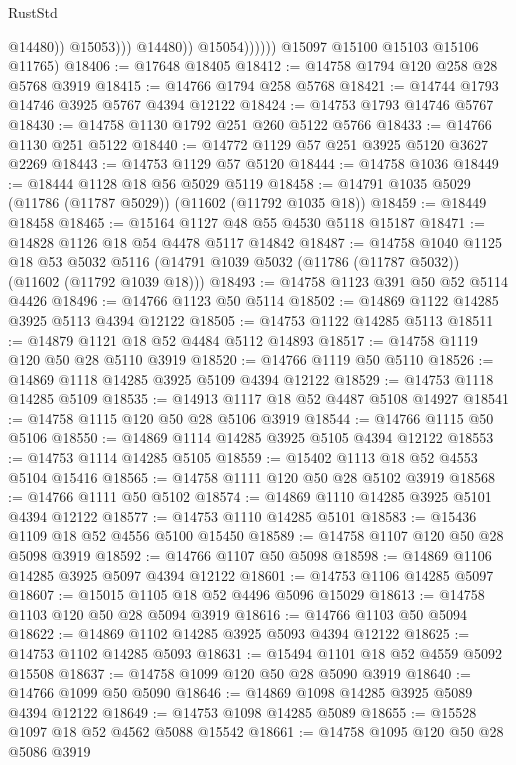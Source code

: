 \begin{lexlean}{RustStd}
\begin{coremodule}
                                @14480))
                            @15053)))
                      @14480))
                  @15054))))))
      @15097
      @15100
      @15103
      @15106
      @11765)
@18406 := @17648 @18405
@18412 := @14758 @1794 @120 @258 @28 @5768 @3919
@18415 := @14766 @1794 @258 @5768
@18421 := @14744 @1793 @14746 @3925 @5767 @4394 @12122
@18424 := @14753 @1793 @14746 @5767
@18430 := @14758 @1130 @1792 @251 @260 @5122 @5766
@18433 := @14766 @1130 @251 @5122
@18440 := @14772 @1129 @57 @251 @3925 @5120 @3627 @2269
@18443 := @14753 @1129 @57 @5120
@18444 := @14758 @1036
@18449 := @18444 @1128 @18 @56 @5029 @5119
@18458 := @14791 @1035 @5029 (@11786 (@11787 @5029)) (@11602 (@11792 @1035 @18))
@18459 := @18449 @18458
@18465 := @15164 @1127 @48 @55 @4530 @5118 @15187
@18471 := @14828 @1126 @18 @54 @4478 @5117 @14842
@18487 := @14758
    @1040
    @1125
    @18
    @53
    @5032
    @5116
    (@14791 @1039 @5032 (@11786 (@11787 @5032)) (@11602 (@11792 @1039 @18)))
@18493 := @14758 @1123 @391 @50 @52 @5114 @4426
@18496 := @14766 @1123 @50 @5114
@18502 := @14869 @1122 @14285 @3925 @5113 @4394 @12122
@18505 := @14753 @1122 @14285 @5113
@18511 := @14879 @1121 @18 @52 @4484 @5112 @14893
@18517 := @14758 @1119 @120 @50 @28 @5110 @3919
@18520 := @14766 @1119 @50 @5110
@18526 := @14869 @1118 @14285 @3925 @5109 @4394 @12122
@18529 := @14753 @1118 @14285 @5109
@18535 := @14913 @1117 @18 @52 @4487 @5108 @14927
@18541 := @14758 @1115 @120 @50 @28 @5106 @3919
@18544 := @14766 @1115 @50 @5106
@18550 := @14869 @1114 @14285 @3925 @5105 @4394 @12122
@18553 := @14753 @1114 @14285 @5105
@18559 := @15402 @1113 @18 @52 @4553 @5104 @15416
@18565 := @14758 @1111 @120 @50 @28 @5102 @3919
@18568 := @14766 @1111 @50 @5102
@18574 := @14869 @1110 @14285 @3925 @5101 @4394 @12122
@18577 := @14753 @1110 @14285 @5101
@18583 := @15436 @1109 @18 @52 @4556 @5100 @15450
@18589 := @14758 @1107 @120 @50 @28 @5098 @3919
@18592 := @14766 @1107 @50 @5098
@18598 := @14869 @1106 @14285 @3925 @5097 @4394 @12122
@18601 := @14753 @1106 @14285 @5097
@18607 := @15015 @1105 @18 @52 @4496 @5096 @15029
@18613 := @14758 @1103 @120 @50 @28 @5094 @3919
@18616 := @14766 @1103 @50 @5094
@18622 := @14869 @1102 @14285 @3925 @5093 @4394 @12122
@18625 := @14753 @1102 @14285 @5093
@18631 := @15494 @1101 @18 @52 @4559 @5092 @15508
@18637 := @14758 @1099 @120 @50 @28 @5090 @3919
@18640 := @14766 @1099 @50 @5090
@18646 := @14869 @1098 @14285 @3925 @5089 @4394 @12122
@18649 := @14753 @1098 @14285 @5089
@18655 := @15528 @1097 @18 @52 @4562 @5088 @15542
@18661 := @14758 @1095 @120 @50 @28 @5086 @3919

\end{coremodule}
\end{lexlean}
